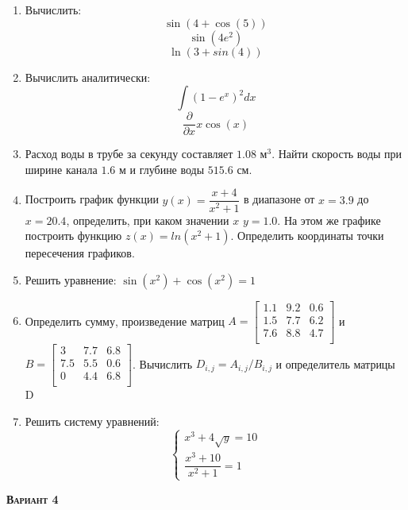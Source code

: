 \begin{enumerate}
\item Вычислить: 
\begin{equation*}\sin(4+\cos(5))                   \end{equation*}
\begin{equation*}\sin(4 e^2)                       \end{equation*}
\begin{equation*}\ln(3+sin(4))                     \end{equation*}

\item Вычислить аналитически: 
 \begin{equation*} \int (1-e^x)^2 dx          \end{equation*}\begin{equation*} \dfrac{\partial} {\partial x} x\cos(x)              \end{equation*}


\item Расход воды в трубе за секунду составляет $1.08$ $\text{м}^3$. Найти скорость воды при ширине канала $1.6$ м и глубине воды $515.6$ см.

\item Построить график функции $y(x)=\dfrac{x+4}{x^2+1}    $ в диапазоне от $x=3.9$ до $x=20.4$, определить, при каком значении $x$ $y=1.0$. На этом же графике построить функцию $z(x)=ln(x^2+1)                 $. Определить координаты точки пересечения графиков. \item Решить уравнение: $\sin(x^2)+\cos(x^2)=1$

\item Определить сумму, произведение матриц $A=\begin{bmatrix}
1.1 &9.2 &0.6 \\
1.5 &7.7 &6.2 \\
7.6 &8.8 &4.7 \\
\end{bmatrix}
$ и $B=\begin{bmatrix}
3 &7.7 &6.8 \\
7.5 &5.5 &0.6 \\
0 &4.4 &6.8 \\
\end{bmatrix}
$. Вычислить $D_{i,j}=A_{i,j}  /  B_{i,j}$ и определитель матрицы D

\item Решить систему уравнений: \begin{equation*} \begin{cases} x^3+4 \sqrt{y}=10    \\ \dfrac{x^3+10}{x^2+1} = 1 \end{cases} \end{equation*} 

\end{enumerate}
\textsc{\textbf{Вариант 4}}

